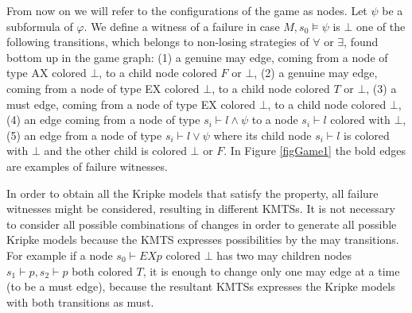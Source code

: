 \documentclass{llncs}
\begin{document}
From now on we will refer to the configurations of the game as nodes. Let $\psi$ be a subformula of $\varphi$. We define a witness of a failure in case $M,s_{0} \models \psi$ is $\bot$ one of the following transitions, which belongs to non-losing strategies of $\forall$ or $\exists$, found bottom up in the game graph: (1) a genuine may edge, coming from a node of type AX colored $\bot$, to a child node colored $F$ or $\bot$, (2) a genuine may edge, coming from a node of type EX colored $\bot$, to a child node colored $T$ or $\bot$, (3) a must edge, coming from a node of type EX colored $\bot$, to a child node colored $\bot$, (4) an edge coming from a node of type $s_{i} \vdash l \wedge \psi$ to a node $s_{i} \vdash l$ colored with $\bot$, (5) an edge from a node of type $s_{i} \vdash l \vee \psi$ where its child node $s_{i} \vdash l$ is colored with $\bot$ and the other child is colored $\bot$ or $F$. In Figure \ref{figGame1} the bold edges are examples of failure witnesses.

In order to obtain all the Kripke models that satisfy the property, all failure witnesses might be considered, resulting in different KMTSs. It is not necessary to consider all possible combinations of changes in order to generate all possible Kripke models because the KMTS expresses possibilities by the may transitions. For example if a node $s_{0} \vdash EXp$ colored $\bot$ has two may children nodes $s_{1} \vdash p, s_{2} \vdash p$ both colored $T$, it is enough to change only one may edge at a time (to be a must edge), because the resultant KMTSs expresses the Kripke models with both transitions as must.
\end{document}
